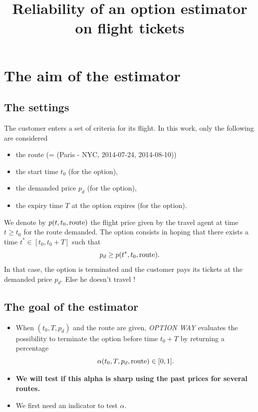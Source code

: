 \documentclass{beamer}
\title{\Large Reliability of an option estimator on flight tickets}
\begin{document}
\frame{\titlepage}
\section{The aim of the estimator}
\subsection{The settings} 
\frame 
{ 
The customer enters a set of criteria for its flight. In this work, only the following are considered
\begin{itemize}
\item the route (= (Paris - NYC,  2014-07-24, 2014-08-10)) 
\item the start time $t_0$ (for the option),
\item the demanded price $p_d$ (for the option),
\item the expiry time $T$ at the option expires (for the option). 
\end{itemize}
We denote by $p(t,t_0,{\rm route})$ the flight price given by the travel agent at time $t\geq t_0$ for the route demanded. The option consists in hoping that there exists a time $t^*\in [ t_0, t_0+T]$ such that 
$$p_d\geq p(t^*,t_0,{\rm route}).$$
In that case, the option is terminated and the customer pays its tickets at the demanded price $p_d$. Else he doesn't travel ! 
}


\subsection{The goal of the estimator} 
\frame 
{ 
\begin{itemize}
\item When $(t_0,T,p_d)$ and the route are given, \textit{OPTION WAY} evaluates the possibility to terminate the option before time $t_0+T$ by returning a percentage 
$$\alpha(t_0,T, p_d, {\rm route})\in [0,1].$$

\item \textbf{We will test if this alpha is sharp using the past prices for several routes. }\\
\item We first need an indicator to test $\alpha$.
\end{itemize}
}
\end{document}
